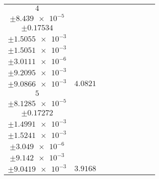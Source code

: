 \documentclass[8pt]{article}
\begin{document}
\begin{longtable}[l]{c c c c c c c c c}
$\num{4}$ & \begin{tabular}[c]{@{}c@{}}$\num{2.9174e-2}$ \\ $\pm\num{8.439e-5}$\end{tabular} & \begin{tabular}[c]{@{}c@{}}$\num{-0.61992}$ \\ $\pm\num{0.17534}$\end{tabular} & \begin{tabular}[c]{@{}c@{}}$\num{-4.9687}$ \\ $\pm\num{1.5055e-3}$\end{tabular} & \begin{tabular}[c]{@{}c@{}}$\num{725.6}$ \\ $\pm\num{1.5051e-3}$\end{tabular} & \begin{tabular}[c]{@{}c@{}}$\num{1.4516}$ \\ $\pm\num{3.0111e-6}$\end{tabular} & \begin{tabular}[c]{@{}c@{}}$\num{3.0836}$ \\ $\pm\num{9.2095e-3}$\end{tabular} & \begin{tabular}[c]{@{}c@{}}$\num{3.0528}$ \\ $\pm\num{9.0866e-3}$\end{tabular} & $\num{4.0821}$\\
$\num{5}$ & \begin{tabular}[c]{@{}c@{}}$\num{2.7929e-2}$ \\ $\pm\num{8.1285e-5}$\end{tabular} & \begin{tabular}[c]{@{}c@{}}$\num{-0.36732}$ \\ $\pm\num{0.17272}$\end{tabular} & \begin{tabular}[c]{@{}c@{}}$\num{4.9671}$ \\ $\pm\num{1.4991e-3}$\end{tabular} & \begin{tabular}[c]{@{}c@{}}$\num{735.54}$ \\ $\pm\num{1.5241e-3}$\end{tabular} & \begin{tabular}[c]{@{}c@{}}$\num{1.4715}$ \\ $\pm\num{3.049e-6}$\end{tabular} & \begin{tabular}[c]{@{}c@{}}$\num{3.018}$ \\ $\pm\num{9.142e-3}$\end{tabular} & \begin{tabular}[c]{@{}c@{}}$\num{3.0175}$ \\ $\pm\num{9.0419e-3}$\end{tabular} & $\num{3.9168}$\\

\end{longtable}
\end{document}
